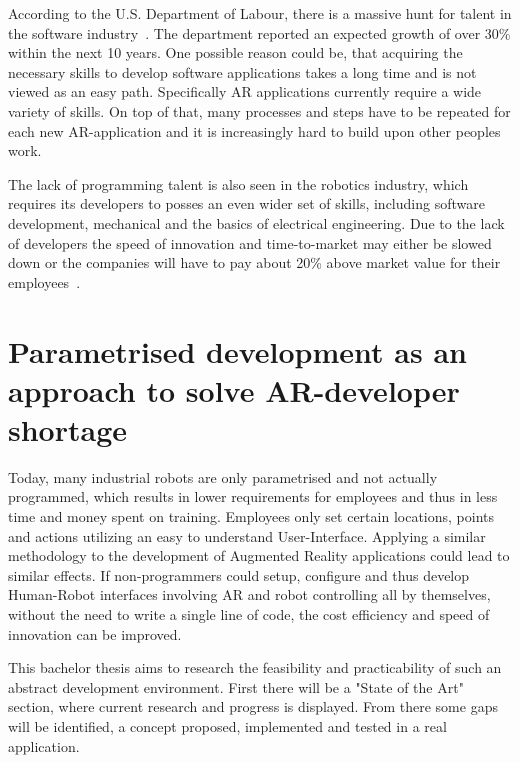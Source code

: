 According to the U.S. Department of Labour, there is a massive hunt for talent in the software industry~\cite{blsGov}. The department reported an expected growth of over 30\% within the next 10 years. One possible reason could be, that acquiring the necessary skills to develop software applications takes a long time and is not viewed as an easy path. Specifically AR applications currently require a wide variety of skills. On top of that, many processes and steps have to be repeated for each new AR-application and it is increasingly hard to build upon other peoples work.

The lack of programming talent is also seen in the robotics industry, which requires its developers to posses an even wider set of skills, including software development, mechanical and the basics of electrical engineering. Due to the lack of developers the speed of innovation and time-to-market may either be slowed down or the companies will have to pay about 20\% above market value for their employees~\cite{devShortageHackernoon}.

\section{Parametrised development as an approach to solve AR-developer shortage}
\label{Section:PARRHIApproach}
Today, many industrial robots are only parametrised and not actually programmed, which results in lower requirements for employees and thus in less time and money spent on training. Employees only set certain locations, points and actions utilizing an easy to understand User-Interface. Applying a similar methodology to the development of Augmented Reality applications could lead to similar effects. If non-programmers could setup, configure and thus develop Human-Robot interfaces involving AR and robot controlling all by themselves, without the need to write a single line of code, the cost efficiency and speed of innovation can be improved.

This bachelor thesis aims to research the feasibility and practicability of such an abstract development environment. First there will be a "State of the Art" section, where current research and progress is displayed. From there some gaps will be identified, a concept proposed, implemented and tested in a real application.



























